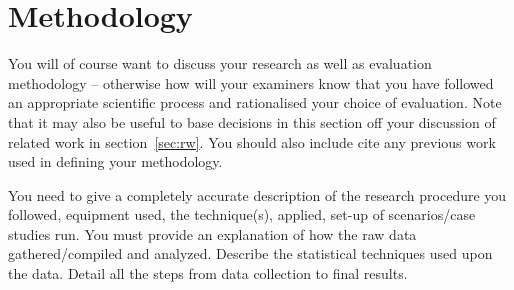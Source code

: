 
\section{Methodology}
\label{sec:Methodology}

You will of course want to discuss your research as well as evaluation methodology -- otherwise how will your examiners know that you have followed an appropriate scientific process and rationalised your choice of evaluation. Note that it may also be useful to base decisions in this section off your discussion of related work in section~\ref{sec:rw}. You should also include cite any previous work used in defining your methodology.

You need to give a completely accurate description of the research procedure you followed, equipment used, the technique(s), applied, set-up of scenarios/case studies run. You must provide an explanation of how the raw data gathered/compiled and analyzed. Describe the statistical techniques used upon the data. Detail all the steps from data collection to final results.
